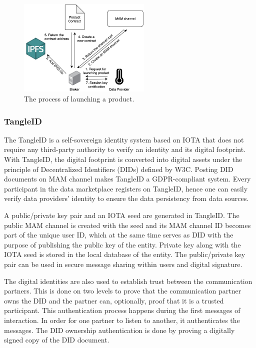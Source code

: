 \documentclass[conference]{IEEEtran}
\begin{document}
\begin{figure}[!t]
    \centering
    \includegraphics[width=2.5in]{launching_product}
    \caption{The process of launching a product.}
    \label{fig:launching_product}
\end{figure}

\subsubsection{TangleID}
The TangleID\cite{TangleID} is a self-sovereign identity system based on IOTA that does not require any third-party authority to verify an identity and its digital footprint. With TangleID, the digital footprint is converted into digital assets under the principle of Decentralized Identifiers (DIDs)\cite{DID} defined by W3C. Posting DID documents on MAM channel makes TangleID a GDPR-compliant system\cite{GDPR}. Every participant in the data marketplace registers on TangleID, hence one can easily verify data providers' identity to ensure the data persistency from data sources.

A public/private key pair and an IOTA seed are generated in TangleID. The public MAM channel is created with the seed and its MAM channel ID becomes part of the unique user ID, which at the same time serves as DID with the purpose of publishing the public key of the entity. Private key along with the IOTA seed is stored in the local database of the entity. The public/private key pair can be used in secure message sharing within users and digital signature.

The digital identities are also used to establish trust between the communication partners. This is done on two levels to prove that the communication partner owns the DID and the partner can, optionally, proof that it is a trusted participant. This authentication process happens during the first messages of interaction. In order for one partner to listen to another, it authenticates the messages. The DID ownership authentication is done by proving a digitally signed copy of the DID document.
\end{document}
